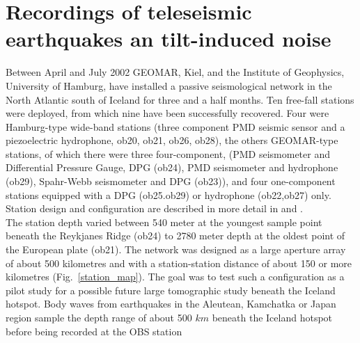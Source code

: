 \documentclass{article}
\begin{document}
{\section{Recordings of teleseismic earthquakes 
an tilt-induced noise
}
Between April and July 2002 
GEOMAR, Kiel, and the Institute of Geophysics, University of Hamburg, 
have installed a passive seismological network
in the North Atlantic south of Iceland
for three and a half months.
Ten free-fall stations were deployed, from which nine have been successfully recovered.
Four were 
Hamburg-type wide-band stations
(three component PMD seismic sensor and a piezoelectric 
hydrophone,
ob20, ob21, ob26, ob28),
the others GEOMAR-type stations, of which there were 
three four-component, (PMD seismometer and Differential Pressure
Gauge, DPG (ob24), PMD seismometer and 
 hydrophone (ob29), Spahr-Webb seismometer and
DPG (ob23)),
 and four 
one-component stations equipped  with a DPG (ob25.ob29) or hydrophone (ob22,ob27) only. 
Station design and configuration are described in more detail in 
\cite{dahm:02} and
\cite{flueh:99}.
\\
The station depth varied between 540 meter at the youngest sample point 
beneath the Reykjanes Ridge (ob24) to  
2780 meter depth at the oldest point of the European plate (ob21).
The network was designed as a large aperture array of about 500 kilometres
and with a station-station 
distance of about 150 or more kilometres (Fig.~\ref{station_map}).
The goal was to test such a configuration as a pilot study for a
possible future
large tomographic study beneath the Iceland hotspot.
Body waves from earthquakes in the Aleutean, Kamchatka 
or Japan region sample the depth range of about 500 $km$ beneath 
the Iceland hotspot before being recorded at the OBS station
\\


}
\end{document}
